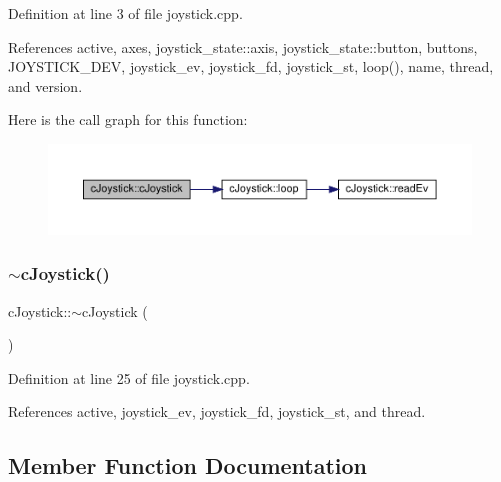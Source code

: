 Definition at line 3 of file joystick.\+cpp.



References active, axes, joystick\+\_\+state\+::axis, joystick\+\_\+state\+::button, buttons, J\+O\+Y\+S\+T\+I\+C\+K\+\_\+\+D\+EV, joystick\+\_\+ev, joystick\+\_\+fd, joystick\+\_\+st, loop(), name, thread, and version.

Here is the call graph for this function\+:\nopagebreak
\begin{figure}[H]
\begin{center}
\leavevmode
\includegraphics[width=350pt]{classc_joystick_ae4edecc3589f19b068113cdb79f7b39d_cgraph}
\end{center}
\end{figure}
\mbox{\label{classc_joystick_a9e429f765dee1dc7dc3d31dc0f50ae0e}} 
\subsubsection{\texorpdfstring{$\sim$c\+Joystick()}{~cJoystick()}}
{\footnotesize\ttfamily c\+Joystick\+::$\sim$c\+Joystick (\begin{DoxyParamCaption}{ }\end{DoxyParamCaption})}



Definition at line 25 of file joystick.\+cpp.



References active, joystick\+\_\+ev, joystick\+\_\+fd, joystick\+\_\+st, and thread.



\subsection{Member Function Documentation}
\mbox{\label{classc_joystick_a10375763b82c2da3e904d118d5cf2ecb}} 
